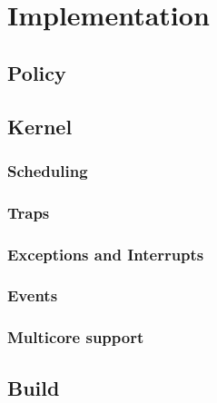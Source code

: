 \chapter{Implementation}
\section{Policy}
\section{Kernel}
\subsection{Scheduling}
\subsection{Traps}
\subsection{Exceptions and Interrupts}
\subsection{Events}
\subsection{Multicore support}
\section{Build}
